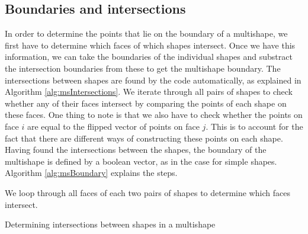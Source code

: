 \documentclass[11pt, a4paper]{article}
\theoremstyle{definition}
\begin{document}
\subsection{Boundaries and intersections}
In order to  determine the points that lie on the boundary of a multishape, we first have to determine which faces of which shapes intersect. Once we have this information, we can take the boundaries of the individual shapes and substract the intersection boundaries from these to get the multishape boundary.
The intersections between shapes are found by the code automatically, as explained in Algorithm \ref{alg:msIntersections}. We iterate through all pairs of shapes to check whether any of their faces intersect by comparing the points of each shape on these faces. One thing to note is that we also have to check whether the points on face $i$ are equal to the flipped vector of points on face $j$. This is to account for the fact that there are different ways of constructing these points on each shape.
Having found the intersections between the shapes, the boundary of the multishape is defined by a boolean vector, as in the case for simple shapes. Algorithm \ref{alg:msBoundary} explains the steps.

\begin{algorithm}[H]
	\SetAlgoLined
	We loop through all faces of each two pairs of shapes to determine which faces intersect. 
	\caption{Determining intersections between shapes in a multishape}
	\label{alg:msIntersections}
\end{algorithm}
\end{document}
